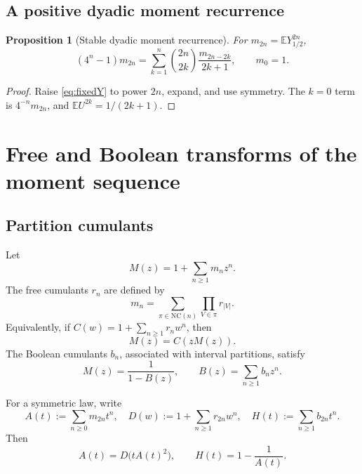 \documentclass[11pt]{article}
\newtheorem{proposition}[theorem]{Proposition}
\theoremstyle{definition}
\newcommand{\E}{\mathbb{E}}
\begin{document}
\subsection{A positive dyadic moment recurrence}
\begin{proposition}[Stable dyadic moment recurrence]\label{prop:momentrec}
For \(m_{2n}=\E Y_{1/2}^{2n}\),
\begin{equation}\label{eq:dyadicmomentrec}
(4^n-1)m_{2n}=\sum_{k=1}^n\binom{2n}{2k}\frac{m_{2n-2k}}{2k+1},\qquad m_0=1.
\end{equation}
\end{proposition}
\begin{proof}
Raise \eqref{eq:fixedY} to power \(2n\), expand, and use symmetry. The \(k=0\) term is \(4^{-n}m_{2n}\), and \(\E U^{2k}=1/(2k+1)\).
\end{proof}

\section{Free and Boolean transforms of the moment sequence}
\subsection{Partition cumulants}
Let
\[
M(z)=1+\sum_{n\ge1}m_nz^n.
\]
The free cumulants \(r_n\) are defined by
\begin{equation}\label{eq:NCmoment}
m_n=\sum_{\pi\in\mathrm{NC}(n)}\prod_{V\in\pi}r_{|V|}.
\end{equation}
Equivalently, if \(C(w)=1+\sum_{n\ge1}r_nw^n\), then
\begin{equation}\label{eq:MCrelation}
M(z)=C(zM(z)).
\end{equation}
The Boolean cumulants \(b_n\), associated with interval partitions, satisfy
\begin{equation}\label{eq:booleanrelation}
M(z)=\frac{1}{1-B(z)},\qquad B(z)=\sum_{n\ge1}b_nz^n.
\end{equation}

For a symmetric law, write
\begin{equation}\label{eq:Adef}
A(t):=\sum_{n\ge0}m_{2n}t^n,
\quad D(w):=1+\sum_{n\ge1}r_{2n}w^n,
\quad H(t):=\sum_{n\ge1}b_{2n}t^n.
\end{equation}
Then
\begin{equation}\label{eq:compressedrelations}
A(t)=D\bigl(tA(t)^2\bigr),
\qquad H(t)=1-\frac1{A(t)}.
\end{equation}
\end{document}
